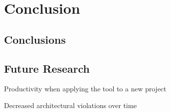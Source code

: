 \chapter{Conclusion}

\section{Conclusions}




\section{Future Research}

Productivity when applying the tool to a new project

Decreased architectural violations over time


